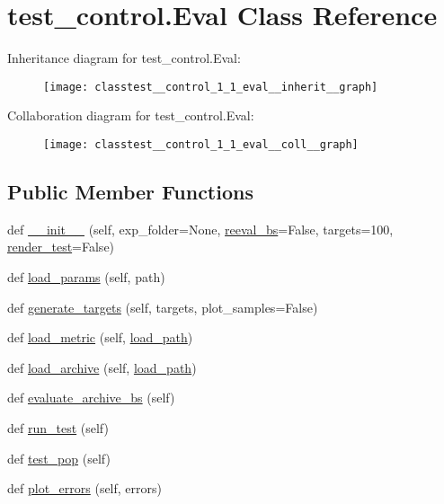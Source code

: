 \hypertarget{classtest__control_1_1_eval}{}\section{test\+\_\+control.\+Eval Class Reference}
\label{classtest__control_1_1_eval}


Inheritance diagram for test\+\_\+control.\+Eval\+:
\nopagebreak
\begin{figure}[H]
\begin{center}
\leavevmode
\texttt{[image: classtest\_\_control\_1\_1\_eval\_\_inherit\_\_graph]}
\end{center}
\end{figure}


Collaboration diagram for test\+\_\+control.\+Eval\+:
\nopagebreak
\begin{figure}[H]
\begin{center}
\leavevmode
\texttt{[image: classtest\_\_control\_1\_1\_eval\_\_coll\_\_graph]}
\end{center}
\end{figure}
\subsection*{Public Member Functions}
\begin{DoxyCompactItemize}
\item 
def \hyperlink{classtest__control_1_1_eval_a1b257767234e3be30d4af61ef3a21f45}{\+\_\+\+\_\+init\+\_\+\+\_\+} (self, exp\+\_\+folder=None, \hyperlink{classtest__control_1_1_eval_a9b41dd8445a9a2067a0c1c1c643e96a6}{reeval\+\_\+bs}=False, targets=100, \hyperlink{classtest__control_1_1_eval_a71aaa37227ff6276d6488c797e5a5820}{render\+\_\+test}=False)
\item 
def \hyperlink{classtest__control_1_1_eval_aa8bf071e724d4ff27d7d71ac8dbe2346}{load\+\_\+params} (self, path)
\item 
def \hyperlink{classtest__control_1_1_eval_aefc5a8288bc5e4f3d0bdc9635bd7908a}{generate\+\_\+targets} (self, targets, plot\+\_\+samples=False)
\item 
def \hyperlink{classtest__control_1_1_eval_abb802977641a9f0fd8c7c3e1520d0f7d}{load\+\_\+metric} (self, \hyperlink{namespacetest__control_ae0ffacf2431cf5da41b09805a26a445f}{load\+\_\+path})
\item 
def \hyperlink{classtest__control_1_1_eval_a104cf2741a1c817f398c38a95b1ca6aa}{load\+\_\+archive} (self, \hyperlink{namespacetest__control_ae0ffacf2431cf5da41b09805a26a445f}{load\+\_\+path})
\item 
def \hyperlink{classtest__control_1_1_eval_ad07668624a0db70fd570cc8730db48b5}{evaluate\+\_\+archive\+\_\+bs} (self)
\item 
def \hyperlink{classtest__control_1_1_eval_a517f808e0d8cfcf4a5771bbe2e827af1}{run\+\_\+test} (self)
\item 
def \hyperlink{classtest__control_1_1_eval_ac55ce3f99825a3131d4ca71df7bbcf44}{test\+\_\+pop} (self)
\item 
def \hyperlink{classtest__control_1_1_eval_a3880cf81f8669ab0c7f60e8510f22a08}{plot\+\_\+errors} (self, errors)
\end{DoxyCompactItemize}
